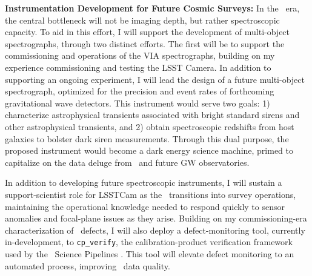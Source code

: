 
\textbf{Instrumentation Development for Future Cosmic Surveys:}
In the \LSST\ era, the central bottleneck will not be imaging depth, but rather spectroscopic capacity. To aid in this effort, I will support the development of multi-object spectrographs, through two distinct efforts. The first will be to support the commissioning and operations of the VIA spectrographs, building on my experience commissioning and testing the LSST Camera. In addition to supporting an ongoing experiment, I will lead the design of a future multi-object spectrograph, optimized for the precision and event rates of forthcoming gravitational wave detectors. This instrument would serve two goals: 1) characterize astrophysical transients associated with bright standard sirens and other astrophysical transients, and 2) obtain spectroscopic redshifts from host galaxies to bolster dark siren measurements. Through this dual purpose, the proposed instrument would become a dark energy science machine, primed to capitalize on the data deluge from \LSST\ and future GW observatories. 

In addition to developing future spectroscopic instruments, 
I will sustain a support-scientist role for LSSTCam as the \LSST\ transitions into survey operations, maintaining the operational knowledge needed to respond quickly to sensor anomalies and focal-plane issues as they arise.
Building on my commissioning-era characterization of \LSSTCam\ defects, I will also deploy a defect-monitoring tool, currently in-development, to \texttt{cp\_verify}, the calibration-product verification framework used by the \LSST\ Science Pipelines \cite{10.71929/rubin/2570545}. This tool will elevate defect monitoring to an automated process, improving \LSST\ data quality.